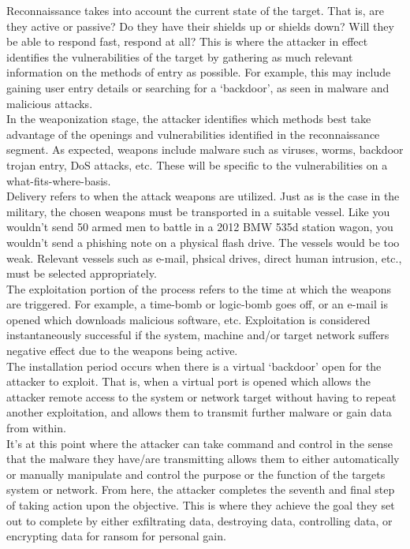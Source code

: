 \documentclass[11pt, english]{article}
\begin{document}
	Reconnaissance takes into account the current state of the target. That is, are they active or passive? Do they have their shields up or shields down? Will they be able to respond fast, respond at all? This is where the attacker in effect identifies the vulnerabilities of the target by gathering as much relevant information on the methods of entry as possible. For example, this may include gaining user entry details or searching for a `backdoor', as seen in malware and malicious attacks.\\

	In the weaponization stage, the attacker identifies which methods best take advantage of the openings and vulnerabilities identified in the reconnaissance segment. As expected, weapons include malware such as viruses, worms, backdoor trojan entry, DoS attacks, etc. These will be specific to the vulnerabilities on a what-fits-where-basis.\\

	Delivery refers to when the attack weapons are utilized. Just as is the case in the military, the chosen weapons must be transported in a suitable vessel. Like you wouldn't send 50 armed men to battle in a 2012 BMW 535d station wagon, you wouldn't send a phishing note on a physical flash drive. The vessels would be too weak. Relevant vessels such as e-mail, phsical drives, direct human intrusion, etc., must be selected appropriately.\\

	The exploitation portion of the process refers to the time at which the weapons are triggered. For example, a time-bomb or logic-bomb goes off, or an e-mail is opened which downloads malicious software, etc. Exploitation is considered instantaneously successful if the system, machine and/or target network suffers negative effect due to the weapons being active.\\

	The installation period occurs when there is a virtual `backdoor' open for the attacker to exploit. That is, when a virtual port is opened which allows the attacker remote access to the system or network target without having to repeat another exploitation, and allows them to transmit further malware or gain data from within.\\

	It's at this point where the attacker can take command and control in the sense that the malware they have/are transmitting allows them to either automatically or manually manipulate and control the purpose or the function of the targets system or network. From here, the attacker completes the seventh and final step of taking action upon the objective. This is where they achieve the goal they set out to complete by either exfiltrating data, destroying data, controlling data, or encrypting data for ransom for personal gain.\\
\end{document}
